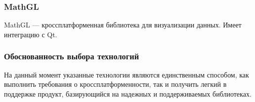 \subsubsection{MathGL}
MathGL — кроссплатформенная библиотека для визуализации данных. Имеет интеграцию с Qt.

\subsubsection{Обоснованность выбора технологий}
На данный момент указанные технологии являются единственным способом, как выполнить требования о кроссплатформенности, так и получить легкий в поддержке
продукт, базирующийся на надежных и поддерживаемых библиотеках.
